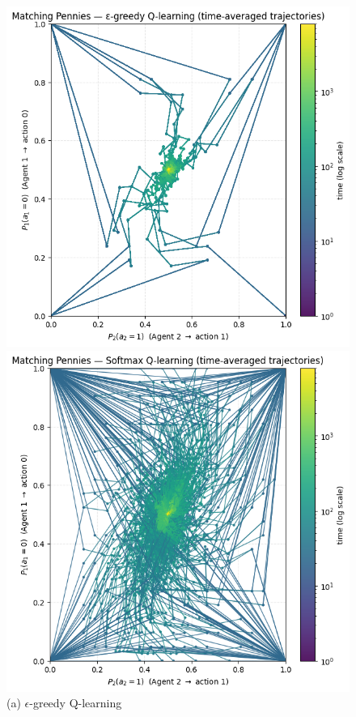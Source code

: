 \begin{figure}[h]
    \centering
    \begin{minipage}{0.32\textwidth}
        \centering
        \includegraphics[width=\linewidth]{figures/task-2/learning/mp_egreedy.png}
        \caption*{(a) $\epsilon$-greedy Q-learning}
    \end{minipage}
    \hfill
    \begin{minipage}{0.32\textwidth}
        \centering
        \includegraphics[width=\linewidth]{figures/task-2/learning/mp_boltz.png}

\end{minipage}
\end{figure}
